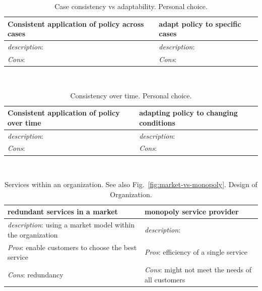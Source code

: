 \begin{center}
\begin{table}[ht]
\begin{tabular}{ | m{\dilemmatablewidth}| m{\dilemmatablewidth} | }
  \hline
  \textbf{Consistent application of policy across cases} &
  \textbf{adapt policy to specific cases} \\
  \hline
  \textit{description}:  &
  \textit{description}:  \\  
  \hline
  \textit{Cons}:  & 
  \textit{Cons}:  \\
  \hline
\end{tabular}
\caption{Case consistency vs adaptability.
{\tiny Personal choice.}
}
\label{table:policy_consistency_across_cases}
\end{table}
\end{center}

\ \\

\begin{center}
\begin{table}[ht]
\begin{tabular}{ | m{\dilemmatablewidth}| m{\dilemmatablewidth} | }
  \hline
  \textbf{Consistent application of policy over time} &
  \textbf{adapting policy to changing conditions} \\
  \hline
  \textit{description}:  &
  \textit{description}:  \\  
  \hline
  \textit{Cons}:  & 
  \textit{Cons}:  \\
  \hline
\end{tabular}
\caption{Consistency over time.
{\tiny Personal choice.}
}
\label{table:policy_consistency_over_time}
\end{table}
\end{center}

\ \\

\begin{center}
\begin{table}[ht]
\begin{tabular}{ | m{\dilemmatablewidth}| m{\dilemmatablewidth} | } 
  \hline
  \textbf{redundant services in a market} &
  \textbf{monopoly service provider} \\
  \hline
  \textit{description}: using a market model within the organization &
  \textit{description}:  \\  
  \hline
  \textit{Pros}: enable customers to choose the best service &
  \textit{Pros}: efficiency of a single service \\
  \hline
  \textit{Cons}: redundancy & 
  \textit{Cons}: might not meet the needs of all customers \\
  \hline
\end{tabular}
\caption{Services within an organization. See also Fig.~\ref{fig:market-vs-monopoly}.
{\tiny Design of Organization.}
}
\label{table:market-vs-monopoly}
\end{table}
\end{center}


